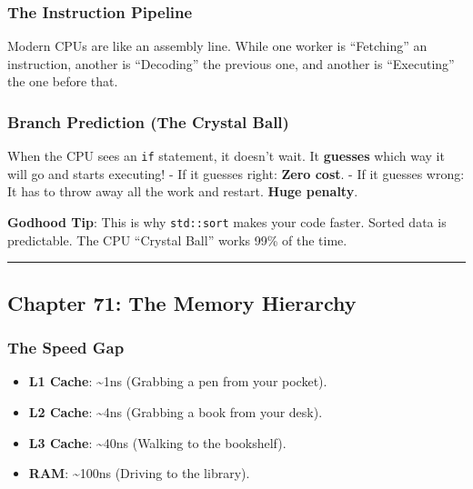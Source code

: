 \hypertarget{the-instruction-pipeline}{%
\subsubsection{The Instruction
Pipeline}\label{the-instruction-pipeline}}

Modern CPUs are like an assembly line. While one worker is ``Fetching''
an instruction, another is ``Decoding'' the previous one, and another is
``Executing'' the one before that.

\hypertarget{branch-prediction-the-crystal-ball}{%
\subsubsection{Branch Prediction (The Crystal
Ball)}\label{branch-prediction-the-crystal-ball}}

When the CPU sees an \passthrough{\lstinline!if!} statement, it doesn't
wait. It \textbf{guesses} which way it will go and starts executing! -
If it guesses right: \textbf{Zero cost}. - If it guesses wrong: It has
to throw away all the work and restart. \textbf{Huge penalty}.

\textbf{Godhood Tip}: This is why \passthrough{\lstinline!std::sort!}
makes your code faster. Sorted data is predictable. The CPU ``Crystal
Ball'' works 99\% of the time.

\begin{center}\rule{0.5\linewidth}{0.5pt}\end{center}

\hypertarget{chapter-71-the-memory-hierarchy}{%
\subsection{Chapter 71: The Memory
Hierarchy}\label{chapter-71-the-memory-hierarchy}}

\hypertarget{the-speed-gap}{%
\subsubsection{The Speed Gap}\label{the-speed-gap}}

\begin{itemize}
\tightlist
\item
  \textbf{L1 Cache}: \textasciitilde1ns (Grabbing a pen from your
  pocket).
\item
  \textbf{L2 Cache}: \textasciitilde4ns (Grabbing a book from your
  desk).
\item
  \textbf{L3 Cache}: \textasciitilde40ns (Walking to the bookshelf).
\item
  \textbf{RAM}: \textasciitilde100ns (Driving to the library).
\end{itemize}

